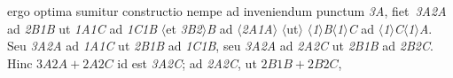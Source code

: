 %
%
%
ergo optima sumitur constructio nempe ad inveniendum
%
punctum
%  
\textit{{\scriptsize 3}A},
\pend \pstart \noindent
\textlangle fiet\textrangle\ \textit{{\scriptsize 3}A{\scriptsize 2}A}
ad \textit{{\scriptsize 2}B{\scriptsize 1}B} ut \textit{{\scriptsize 1}A{\scriptsize 1}C} ad  \textit{{\scriptsize 1}C{\scriptsize 1}B}
\pend \pstart \noindent
$\langle$et \textit{{\scriptsize 3}B{\scriptsize 2}}$\rangle$\textit{B} ad  $\langle$\textit{{\scriptsize 2}A{\scriptsize 1}A}$\rangle$
$\langle$ut$\rangle$ $\langle$\textit{{\scriptsize 1}}$\rangle$\textit{B}$\langle$\textit{{\scriptsize 1}}$\rangle$\textit{C} ad  $\langle$\textit{{\scriptsize 1}}$\rangle$\textit{C}$\langle$\textit{{\scriptsize 1}}$\rangle$\textit{A}.
\pend \pstart
Seu \textit{{\scriptsize 3}A{\scriptsize 2}A} ad \textit{{\scriptsize 1}A{\scriptsize 1}C} 
%
ut \textit{{\scriptsize 2}B{\scriptsize 1}B} ad \textit{{\scriptsize 1}C{\scriptsize 1}B}, seu \textit{{\scriptsize 3}A{\scriptsize 2}A} ad \textit{{\scriptsize 2}A{\scriptsize 2}C}
ut \textit{{\scriptsize 2}B{\scriptsize 1}B} ad \textit{{\scriptsize 2}B{\scriptsize 2}C}. Hinc ${\scriptstyle \textit{3}}A{\scriptstyle \textit{2}}A + {\scriptstyle \textit{2}}A{\scriptstyle \textit{2}}C$
%
id est \textit{{\scriptsize 3}A{\scriptsize 2}C}; ad \textit{{\scriptsize 2}A{\scriptsize 2}C}, ut ${\scriptstyle \textit{2}}B{\scriptstyle \textit{1}}B + {\scriptstyle \textit{2}}B{\scriptstyle \textit{2}}C$, 
